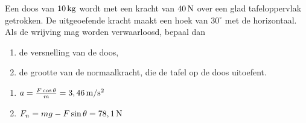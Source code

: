 
\begin{exercise}

 Een doos van $10\rm\,kg$ wordt met een kracht van $40\rm\,N$ over een glad tafeloppervlak getrokken. De uitgeoefende kracht maakt een hoek van $30^\circ$ met de horizontaal. Als de wrijving mag worden verwaarloosd, bepaal dan
\newline
%
%
\begin{minipage}[t]{.6\linewidth}
\begin{enumerate}
\item de versnelling van de doos,
\item de grootte van de normaalkracht, die de tafel op de doos uitoefent.
\end{enumerate}
\end{minipage}
\begin{minipage}[t]{.4\linewidth}
\end{minipage}
%
%
%
\begin{oplossing}
\begin{enumerate}
\item $a=\frac{F\cos\theta}{m}=3,46\rm\,m/s^2$
\item $F_n=mg-F\sin\theta=78,1\rm\,N$
\end{enumerate}
\end{oplossing}


\end{exercise}
